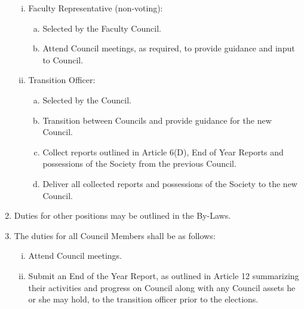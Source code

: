 \documentclass[]{report}
\begin{document}
\begin{enumerate}
\begin{enumerate}[i.]
			\item Faculty Representative (non-voting):
				\begin{enumerate}[(a)]
					\item Selected by the Faculty Council.
					\item Attend Council meetings, as required, to provide guidance and input to Council.
				\end{enumerate}

			\clearpage
			\item Transition Officer:
				\begin{enumerate}[(a)]
					\item Selected by the Council.
					\item Transition between Councils and provide guidance for the new Council.
					\item Collect reports outlined in Article 6(D), End of Year Reports and possessions of the Society from the previous Council.
					\item Deliver all collected reports and possessions of the Society to the new Council.
				\end{enumerate}
		\end{enumerate}
		
		\item Duties for other positions may be outlined in the By-Laws.
		
		\item The duties for all Council Members shall be as follows:
			\begin{enumerate}[i.]
				\item Attend Council meetings.
				\item Submit an End of the Year Report, as outlined in Article 12 summarizing their activities and progress on Council along with any Council assets he or she may hold, to the transition officer prior to the elections.
			\end{enumerate}

	\end{enumerate}
\end{document}
